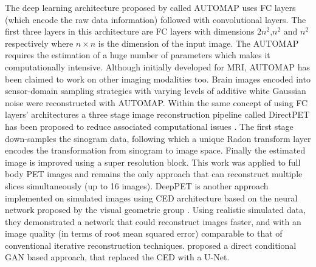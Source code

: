 The deep learning architecture proposed by \cite{zhu2018image} called AUTOMAP uses \ac{FC} layers (which encode the raw data information) followed with convolutional layers. The first three layers in this architecture are \ac{FC} layers with dimensions $2n^2$,$n^2$ and $n^2$ respectively where $n\times{}n$ is the dimension of the input image. The AUTOMAP requires the estimation of a huge number of parameters which makes it computationally intensive. Although initially developed for \ac{MRI}, AUTOMAP has been claimed to work on other imaging modalities too. Brain images encoded into sensor-domain sampling strategies with varying levels of additive white Gaussian noise were reconstructed with AUTOMAP.  Within the same concept of using \ac{FC} layers' architectures a three stage image reconstruction pipeline called DirectPET has been proposed to reduce associated computational issues  \cite{whiteley2019direct}. The first stage down-samples the sinogram data, following which a unique Radon transform layer encodes the transformation from sinogram to image space. Finally the estimated image is improved using a super resolution block. This work was applied to full body \ac{PET} images and remains the only approach that can reconstruct multiple slices simultaneously (up to 16 images). DeepPET is another approach implemented on simulated images using \ac{CED} architecture based on the neural network proposed by the visual geometric group \cite{haeggstroem2018deeprec}. Using realistic simulated data, they demonstrated a network that could reconstruct images faster, and with an image quality (in terms of root mean squared error) comparable to that of conventional iterative reconstruction techniques. \cite{liu2019deep} proposed a direct conditional \ac{GAN} based approach, that replaced the \ac{CED} with a U-Net.    


